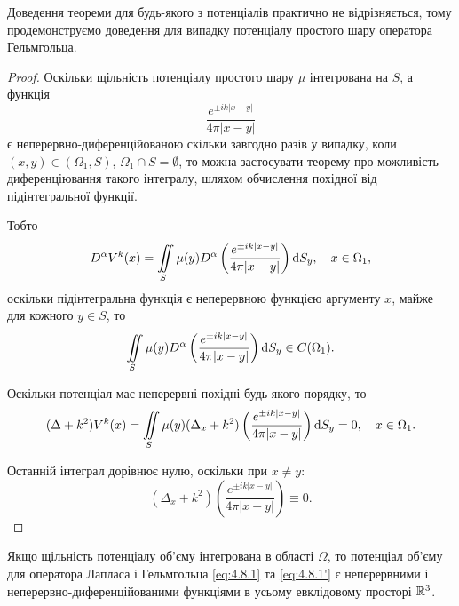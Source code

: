 Доведення теореми для будь-якого з потенціалів практично не відрізняється, тому продемонструємо доведення для випадку потенціалу простого шару оператора Гельмгольца. 

\begin{proof}
	Оскільки щільність потенціалу простого шару $\mu$ інтегрована на $S$, а функція
	\begin{equation}
		\frac{e^{\pm i k |x - y|}}{4 \pi |x - y|}
	\end{equation}
	є неперервно-диференційованою скільки завгодно разів у випадку, коли $(x, y) \in (\Omega_1, S)$, $\Omega_1 \cap S = \emptyset$, то можна застосувати теорему про можливість диференціювання такого інтегралу, шляхом обчислення похідної від підінтегральної функції. \medskip

	Тобто
	\begin{equation}
		D^\alpha V^k(x) = \displaystyle\iint\limits_S \mu(y) D^\alpha \left( \frac{e^{\pm i k |x - y|}}{4 \pi |x - y|} \right) \mathop{}\!\mathrm{d} S_y, \quad x \in \Omega_1,
	\end{equation}
	оскільки підінтегральна функція є неперервною функцією аргументу $x$, майже для кожного $y \in S$, то 
	\begin{equation}
		\displaystyle\iint\limits_S \mu(y) D^\alpha \left( \frac{e^{\pm i k |x - y|}}{4 \pi |x - y|} \right) \mathop{}\!\mathrm{d} S_y \in C(\Omega_1).
	\end{equation}

	Оскільки потенціал має неперервні похідні будь-якого порядку, то
	\begin{equation}
		(\Delta + k^2) V^k(x) = \displaystyle\iint\limits_S \mu(y) (\Delta_x + k^2) \left( \frac{e^{\pm i k |x - y|}}{4 \pi |x - y|} \right) \mathop{}\!\mathrm{d} S_y = 0, \quad x \in \Omega_1.
	\end{equation}

	Останній інтеграл дорівнює нулю, оскільки при $x \ne y$:
	\begin{equation}
		(\Delta_x + k^2) \left( \frac{e^{\pm i k |x - y|}}{4 \pi |x - y|} \right) \equiv 0.
	\end{equation}
\end{proof}

\begin{theorem}
	\label{th:4.8.2}
	Якщо щільність потенціалу об'єму інтегрована в області $\Omega$, то потенціал об'єму для оператора Лапласа і Гельмгольца \eqref{eq:4.8.1} та \eqref{eq:4.8.1'} є неперервними і неперервно-диференційованими функціями в усьому евклідовому просторі $\mathbb{R}^3$.
\end{theorem}

